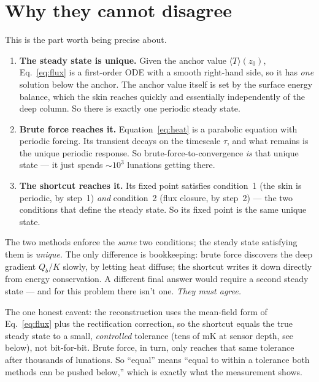 \documentclass[11pt]{article}
\newcommand{\Tm}{\langle T\rangle}
\begin{document}
\section{Why they cannot disagree}

This is the part worth being precise about.

\begin{enumerate}[leftmargin=1.6em,itemsep=3pt]
\item \textbf{The steady state is unique.} Given the anchor value
$\Tm(z_0)$, Eq.~\eqref{eq:flux} is a first-order ODE with a smooth
right-hand side, so it has \emph{one} solution below the anchor. The anchor
value itself is set by the surface energy balance, which the skin reaches
quickly and essentially independently of the deep column. So there is exactly
one periodic steady state.
\item \textbf{Brute force reaches it.} Equation~\eqref{eq:heat} is a
parabolic equation with periodic forcing. Its transient decays on the
timescale $\tau$, and what remains is the unique periodic response. So
brute-force-to-convergence \emph{is} that unique state --- it just spends
$\sim10^3$ lunations getting there.
\item \textbf{The shortcut reaches it.} Its fixed point satisfies condition~1
(the skin is periodic, by step~1) \emph{and} condition~2 (flux closure, by
step~2) --- the two conditions that define the steady state. So its fixed
point is the same unique state.
\end{enumerate}

\begin{key}
The two methods enforce the \emph{same} two conditions; the steady state
satisfying them is \emph{unique}. The only difference is bookkeeping: brute
force discovers the deep gradient $Q_b/K$ slowly, by letting heat diffuse;
the shortcut writes it down directly from energy conservation. A different
final answer would require a second steady state --- and for this problem
there isn't one. \emph{They must agree.}
\end{key}

\noindent
The one honest caveat: the reconstruction uses the mean-field form of
Eq.~\eqref{eq:flux} plus the rectification correction, so the shortcut equals
the true steady state to a small, \emph{controlled} tolerance (tens of mK at
sensor depth, see below), not bit-for-bit. Brute force, in turn, only reaches
that same tolerance after thousands of lunations. So ``equal'' means ``equal
to within a tolerance both methods can be pushed below,'' which is exactly
what the measurement shows.
\end{document}

